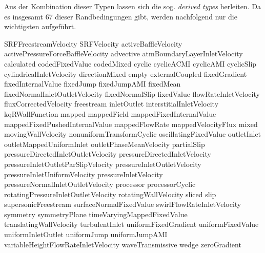 Aus der Kombination dieser Typen lassen sich die sog. \textit{derived types} herleiten. Da es insgesamt 67 dieser Randbedingungen gibt, werden nachfolgend nur die wichtigsten aufgeführt. 


SRFFreestreamVelocity
SRFVelocity
activeBaffleVelocity
activePressureForceBaffleVelocity
advective
atmBoundaryLayerInletVelocity
calculated
codedFixedValue
codedMixed
cyclic
cyclicACMI
cyclicAMI
cyclicSlip
cylindricalInletVelocity
directionMixed
empty
externalCoupled
fixedGradient
fixedInternalValue
fixedJump
fixedJumpAMI
fixedMean
fixedNormalInletOutletVelocity
fixedNormalSlip
fixedValue
flowRateInletVelocity
fluxCorrectedVelocity
freestream
inletOutlet
interstitialInletVelocity
kqRWallFunction
mapped
mappedField
mappedFixedInternalValue
mappedFixedPushedInternalValue
mappedFlowRate
mappedVelocityFlux
mixed
movingWallVelocity
nonuniformTransformCyclic
oscillatingFixedValue
outletInlet
outletMappedUniformInlet
outletPhaseMeanVelocity
partialSlip
pressureDirectedInletOutletVelocity
pressureDirectedInletVelocity
pressureInletOutletParSlipVelocity
pressureInletOutletVelocity
pressureInletUniformVelocity
pressureInletVelocity
pressureNormalInletOutletVelocity
processor
processorCyclic
rotatingPressureInletOutletVelocity
rotatingWallVelocity
sliced
slip
supersonicFreestream
surfaceNormalFixedValue
swirlFlowRateInletVelocity
symmetry
symmetryPlane
timeVaryingMappedFixedValue
translatingWallVelocity
turbulentInlet
uniformFixedGradient
uniformFixedValue
uniformInletOutlet
uniformJump
uniformJumpAMI
variableHeightFlowRateInletVelocity
waveTransmissive
wedge
zeroGradient

\newpage